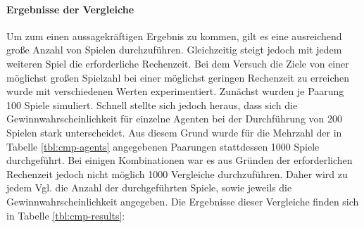 \paragraph{Ergebnisse der Vergleiche}
\label{p:vgl-result}
Um zum einen aussagekräftigen Ergebnis zu kommen, gilt es eine ausreichend große Anzahl von Spielen durchzuführen. Gleichzeitig steigt jedoch mit jedem weiteren Spiel die erforderliche Rechenzeit. Bei dem Versuch die Ziele von einer möglichst großen Spielzahl bei einer möglichst geringen Rechenzeit zu erreichen wurde mit verschiedenen Werten experimentiert. Zunächst wurden je Paarung 100 Spiele simuliert. Schnell stellte sich jedoch heraus, dass sich die Gewinnwahrscheinlichkeit für einzelne Agenten bei der Durchführung von 200 Spielen stark unterscheidet. Aus diesem Grund wurde für die Mehrzahl der in Tabelle \ref{tbl:cmp-agents} angegebenen Paarungen stattdessen 1000 Spiele durchgeführt. Bei einigen Kombinationen war es aus Gründen der erforderlichen Rechenzeit jedoch nicht möglich 1000 Vergleiche durchzuführen. Daher wird zu jedem Vgl. die Anzahl der durchgeführten Spiele, sowie jeweils die Gewinnwahrscheinlichkeit angegeben. Die Ergebnisse dieser Vergleiche finden sich in Tabelle \ref{tbl:cmp-results}:

